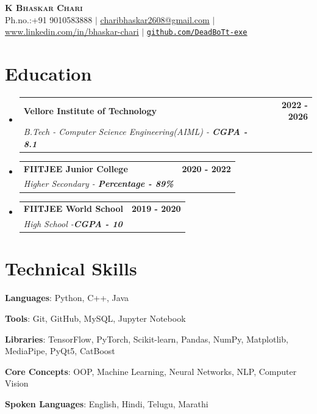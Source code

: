 \documentclass[letterpaper,11pt]{article}
\makeatletter
\newcommand{\resumeSubheading}[4]{
  \vspace{-2pt}\item
    \begin{tabular*}{0.97\textwidth}[t]{l@{\extracolsep{\fill}}r}
      \textbf{#1} & #2 \\
      \textit{\small#3} & \textit{\small #4} \\
    \end{tabular*}\vspace{-7pt}
}
\newcommand{\resumeSubHeadingListStart}{\begin{itemize}[leftmargin=0.15in, label={}]}
\newcommand{\resumeSubHeadingListEnd}{\end{itemize}}
\makeatother
\begin{document}
\begin{center}
  \textbf{\Huge \scshape K Bhaskar Chari} \\[1pt]
  \small Ph.no.:+91 9010583888 $|$
  \href{mailto:charibhaskar2608@gmail.com}{\underline{charibhaskar2608@gmail.com}} $|$
  \href{https://www.linkedin.com/in/bhaskar-chari/}{\underline{www.linkedin.com/in/bhaskar-chari}} $|$
  \href{https://github.com/DeadBoTt-exe}{\underline{\nolinkurl{github.com/DeadBoTt-exe}}} \\
\end{center}


\section{Education}
  \resumeSubHeadingListStart
    \resumeSubheading
      {Vellore Institute of Technology}{\textbf{2022 - 2026}}
      {B.Tech - Computer Science Engineering(AIML) - \textbf{CGPA - 8.1}}{\textbf{}}
    \resumeSubheading
      {FIITJEE Junior College}{\textbf{2020 - 2022}}
      {Higher Secondary - \textbf{Percentage - 89\%}}{\textbf{}}
    \resumeSubheading
        {FIITJEE World School}{\textbf{2019 - 2020}}
        {High School -\textbf{CGPA - 10}}{\textbf{}}
  \resumeSubHeadingListEnd



\section{Technical Skills}
 \begin{itemize}[leftmargin=0.15in, label={}]
    \small{\item{
     \textbf{Languages}{: Python, C++, Java} \\ \vspace{2pt}
     
     \textbf{Tools}{: Git, GitHub, MySQL, Jupyter Notebook}\\ \vspace{2pt}
     
     \textbf{Libraries}{: TensorFlow, PyTorch, Scikit-learn, Pandas, NumPy, Matplotlib, MediaPipe, PyQt5, CatBoost} \\ \vspace{2pt}
     
     \textbf{Core Concepts}{: OOP, Machine Learning, Neural Networks, NLP, Computer Vision}\\ \vspace{2pt}
     
     \textbf{Spoken Languages}{: English, Hindi, Telugu, Marathi} \\     
    }}
 \end{itemize}
\end{document}
